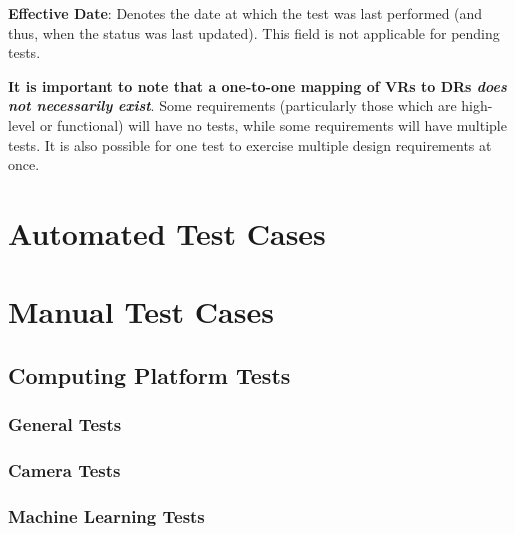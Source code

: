 \documentclass[10pt,letterpaper]{article}
\begin{document}
\textbf{Effective Date}: Denotes the date at which the test was last performed (and thus, when the status was last updated). This field is not applicable for pending tests.

\textbf{It is important to note that a one-to-one mapping of VRs to DRs \textit{does not necessarily exist}}. Some requirements (particularly those which are high-level or functional) will have no tests, while some requirements will have multiple tests. It is also possible for one test to exercise multiple design requirements at once.

\section{Automated Test Cases} \label{begintest}



%

\section{Manual Test Cases}

\subsection{Computing Platform Tests}
\subsubsection{General Tests}


\subsubsection{Camera Tests}


\subsubsection{Machine Learning Tests}

\end{document}
